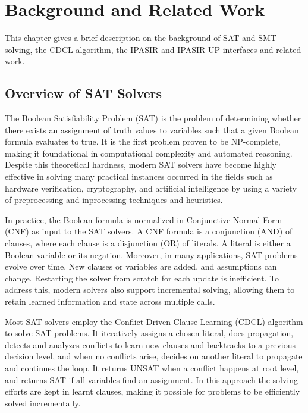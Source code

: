 \chapter{Background and Related Work}

This chapter gives a brief description on the background of SAT and SMT solving, the CDCL algorithm, the IPASIR and IPASIR-UP interfaces and related work.

\section{Overview of SAT Solvers}

The Boolean Satisfiability Problem (SAT) is the problem of determining whether there exists an assignment of truth values to variables such that a given Boolean formula evaluates to true. It is the first problem proven to be NP-complete, making it foundational in computational complexity and automated reasoning. Despite this theoretical hardness, modern SAT solvers have become highly effective in solving many practical instances occurred in the fields such as hardware verification, cryptography, and artificial intelligence by using a variety of preprocessing and inprocessing techniques and heuristics.

In practice, the Boolean formula is normalized in Conjunctive Normal Form (CNF) as input to the SAT solvers. A CNF formula is a conjunction (AND) of clauses, where each clause is a disjunction (OR) of literals. A literal is either a Boolean variable or its negation. Moreover, in many applications, SAT problems evolve over time. New clauses or variables are added, and assumptions can change. Restarting the solver from scratch for each update is inefficient. To address this, modern solvers also support incremental solving, allowing them to retain learned information and state across multiple calls.

Most SAT solvers employ the Conflict-Driven Clause Learning (CDCL) algorithm to solve SAT problems. It iteratively assigns a chosen literal, does propagation, detects and analyzes conflicts to learn new clauses and backtracks to a previous decision level, and when no conflicts arise, decides on another literal to propagate and continues the loop. It returns UNSAT when a conflict happens at root level, and returns SAT if all variables find an assignment. In this approach the solving efforts are kept in learnt clauses, making it possible for problems to be efficiently solved incrementally.

